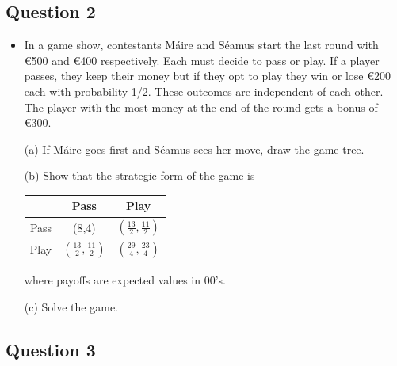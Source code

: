 \documentclass[12pt]{article}
\begin{document}
        \subsection*{Question 2}
        
        \begin{itemize}
   
        \item In a game show, contestants M\'{a}ire and S\'{e}amus start the last round with \euro{500} and \euro{400} respectively. Each must decide to pass or play. If a player passes, they keep their money but if they opt to play they win or lose \euro{200} each with probability 1/2. These outcomes are independent of each other. The player with the most money at the end of the round gets a bonus of \euro{300}.
        \end{itemize}
        \begin{enumerate}
        	\item[(a)] If M\'{a}ire goes first and S\'{e}amus sees her move, draw the game tree. 
        	\item[(b)] Show that the strategic form of the game is
        	
        	\begin{center}
        		
        		\begin{tabular}{|c|c|c|}
        			\hline
        			& Pass         &Play       \\
        			\hline
        			Pass & (8,4) &$\left(\frac{13}{2}, \frac{11}{2}\right)$  \\
        			\hline
        			Play & $\left(\frac{13}{2}, \frac{11}{2}\right)$& $\left(\frac{29}{4}, \frac{23}{4}\right)$ \\
        			\hline
        		\end{tabular}
        	\end{center}
        	where payoffs are expected values in 00's. 
        	
        	\item[(c)] Solve the game. 
        \end{enumerate}
        
        
        
        \subsection*{Question 3}
        
\end{document}
